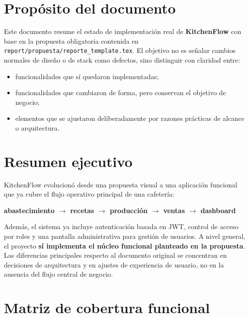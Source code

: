 \documentclass[12pt,letterpaper]{article}
\begin{document}
\newpage

\section{Propósito del documento}
Este documento resume el estado de implementación real de \textbf{KitchenFlow} con base en la propuesta obligatoria contenida en \texttt{report/propuesta/reporte\_template.tex}. El objetivo no es señalar cambios normales de diseño o de stack como defectos, sino distinguir con claridad entre:

\begin{itemize}
	\item funcionalidades que sí quedaron implementadas;
	\item funcionalidades que cambiaron de forma, pero conservan el objetivo de negocio;
	\item elementos que se ajustaron deliberadamente por razones prácticas de alcance o arquitectura.
\end{itemize}

\section{Resumen ejecutivo}
KitchenFlow evolucionó desde una propuesta visual a una aplicación funcional que ya cubre el flujo operativo principal de una cafetería:

\begin{center}
\textbf{abastecimiento \(\rightarrow\) recetas \(\rightarrow\) producción \(\rightarrow\) ventas \(\rightarrow\) dashboard}
\end{center}

Además, el sistema ya incluye autenticación basada en JWT, control de acceso por roles y una pantalla administrativa para gestión de usuarios. A nivel general, el proyecto \textbf{sí implementa el núcleo funcional planteado en la propuesta}. Las diferencias principales respecto al documento original se concentran en decisiones de arquitectura y en ajustes de experiencia de usuario, no en la ausencia del flujo central de negocio.

\section{Matriz de cobertura funcional}
\end{document}
